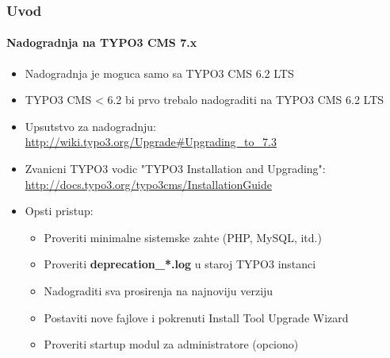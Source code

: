 \begin{frame}[fragile]
	\frametitle{Uvod}
	\framesubtitle{Nadogradnja na TYPO3 CMS 7.x}

	\begin{itemize}
		\item Nadogradnja je moguca samo sa TYPO3 CMS 6.2 LTS
		\item TYPO3 CMS < 6.2 bi prvo trebalo nadograditi na TYPO3 CMS 6.2 LTS
	\end{itemize}

	\begin{itemize}

		\item Upsutstvo za nadogradnju:\newline
			\smaller\url{http://wiki.typo3.org/Upgrade#Upgrading_to_7.3}\normalsize
		\item Zvanicni TYPO3 vodic "TYPO3 Installation and Upgrading":
			\smaller\url{http://docs.typo3.org/typo3cms/InstallationGuide}\normalsize
		\item Opsti pristup:
			\begin{itemize}
				\item Proveriti minimalne sistemske zahte \small(PHP, MySQL, itd.)
				\item Proveriti \textbf{deprecation\_*.log} u staroj TYPO3 instanci
				\item Nadograditi sva prosirenja na najnoviju verziju
				\item Postaviti nove fajlove i pokrenuti Install Tool \textrightarrow Upgrade Wizard
				\item Proveriti startup modul za administratore (opciono)
			\end{itemize}
	\end{itemize}

\end{frame}

